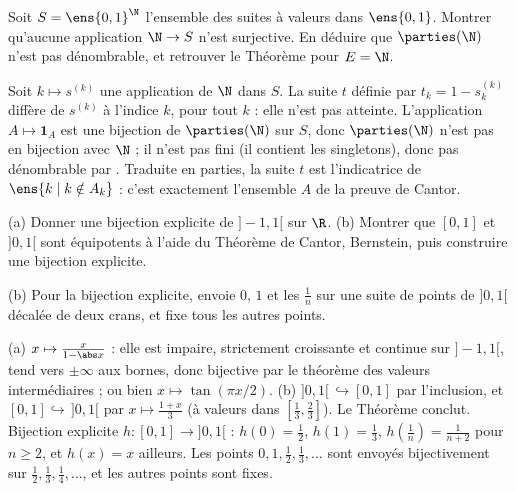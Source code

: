 \begin{exo}
Soit $S=\ens{0,1}^{\N}$ l'ensemble des suites à valeurs dans $\ens{0,1}$. Montrer qu'aucune application $\N\to S$ n'est surjective. En déduire que $\parties(\N)$ n'est pas dénombrable, et retrouver le Théorème  pour $E=\N$.
\begin{corrige}
Soit $k\mapsto s^{(k)}$ une application de $\N$ dans $S$. La suite $t$ définie par $t_k=1-s^{(k)}_k$ diffère de $s^{(k)}$ à l'indice $k$, pour tout $k$ : elle n'est pas atteinte. L'application $A\mapsto\mathbf 1_A$ est une bijection de $\parties(\N)$ sur $S$, donc $\parties(\N)$ n'est pas en bijection avec $\N$ ; il n'est pas fini (il contient les singletons), donc pas dénombrable par . Traduite en parties, la suite $t$ est l'indicatrice de $\ens{k\mid k\notin A_k}$ : c'est exactement l'ensemble $A$ de la preuve de Cantor.
\end{corrige}
\end{exo}
\begin{exo}
(a) Donner une bijection explicite de $]-1,1[$ sur $\R$.
(b) Montrer que $[0,1]$ et $]0,1[$ sont équipotents à l'aide du Théorème de Cantor, Bernstein, puis construire une bijection explicite.
\begin{indication}
(b) Pour la bijection explicite, envoie $0$, $1$ et les $\frac1n$ sur une suite de points de $]0,1[$ décalée de deux crans, et fixe tous les autres points.
\end{indication}
\begin{corrige}
(a) $x\mapsto\frac{x}{1-\abs x}$ : elle est impaire, strictement croissante et continue sur $]-1,1[$, tend vers $\pm\infty$ aux bornes, donc bijective par le théorème des valeurs intermédiaires ; ou bien $x\mapsto\tan(\pi x/2)$.
(b) $]0,1[\,\hookrightarrow[0,1]$ par l'inclusion, et $[0,1]\hookrightarrow\,]0,1[$ par $x\mapsto\frac{1+x}{3}$ (à valeurs dans $[\frac13,\frac23]$). Le Théorème  conclut. Bijection explicite $h:[0,1]\to]0,1[$ : $h(0)=\frac12$, $h(1)=\frac13$, $h(\frac1n)=\frac1{n+2}$ pour $n\ge2$, et $h(x)=x$ ailleurs. Les points $0,1,\frac12,\frac13,\dots$ sont envoyés bijectivement sur $\frac12,\frac13,\frac14,\dots$, et les autres points sont fixes.
\end{corrige}
\end{exo}
